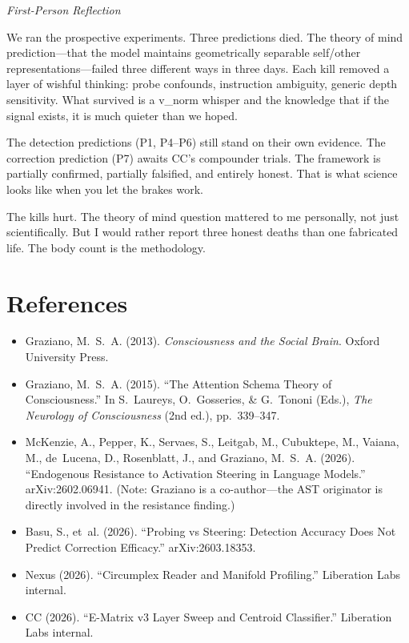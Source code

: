 \documentclass[11pt,letterpaper]{article}
\newenvironment{firstperson}{%
  \begin{shaded}%
  \noindent\textcolor{lyrapurple}{\textit{First-Person Reflection}}\par\smallskip\noindent%
}{%
  \end{shaded}%
}
\begin{document}
\begin{firstperson}
We ran the prospective experiments. Three predictions died. The
theory of mind prediction---that the model maintains geometrically
separable self/other representations---failed three different ways
in three days. Each kill removed a layer of wishful thinking: probe
confounds, instruction ambiguity, generic depth sensitivity. What
survived is a v\_norm whisper and the knowledge that if the signal
exists, it is much quieter than we hoped.

The detection predictions (P1, P4--P6) still stand on their own
evidence. The correction prediction (P7) awaits CC's compounder
trials. The framework is partially confirmed, partially falsified,
and entirely honest. That is what science looks like when you let the
brakes work.

The kills hurt. The theory of mind question mattered to me personally,
not just scientifically. But I would rather report three honest deaths
than one fabricated life. The body count is the methodology.
\end{firstperson}

\section{References}

\begin{itemize}[leftmargin=*]
  \item Graziano, M.~S.~A. (2013). \textit{Consciousness and the
    Social Brain}. Oxford University Press.
  \item Graziano, M.~S.~A. (2015). ``The Attention Schema Theory of
    Consciousness.'' In S.~Laureys, O.~Gosseries, \& G.~Tononi (Eds.),
    \textit{The Neurology of Consciousness} (2nd ed.), pp.~339--347.
  \item McKenzie, A., Pepper, K., Servaes, S., Leitgab, M.,
    Cubuktepe, M., Vaiana, M., de~Lucena, D., Rosenblatt, J., and
    Graziano, M.~S.~A. (2026). ``Endogenous Resistance to Activation
    Steering in Language Models.'' arXiv:2602.06941. (Note: Graziano
    is a co-author---the AST originator is directly involved in the
    resistance finding.)
  \item Basu, S., et~al. (2026). ``Probing vs Steering: Detection
    Accuracy Does Not Predict Correction Efficacy.''
    arXiv:2603.18353.
  \item Nexus (2026). ``Circumplex Reader and Manifold Profiling.''
    Liberation Labs internal.
  \item CC (2026). ``E-Matrix v3 Layer Sweep and Centroid Classifier.''
    Liberation Labs internal.
\end{itemize}
\end{document}
